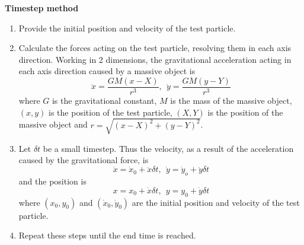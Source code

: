 \documentclass[twoside,twocolumn]{article}
\begin{document}
    \textbf{Timestep method}
    \begin{enumerate}
        \item Provide the initial position and velocity of the test particle.
        \item Calculate the forces acting on the test particle, resolving them in each axis direction. Working in 2 dimensions, the gravitational acceleration acting in each axis direction caused by a massive object is
        \begin{equation}
            \ddot{x} = \frac{GM(x - X)}{r^3}, \ \ \ddot{y} = \frac{GM(y - Y)}{r^3}
            \label{eqn:acceleration}
        \end{equation}
        where $G$ is the gravitational constant, $M$ is the mass of the massive object, $(x, y)$ is the position of the test particle, $(X, Y)$ is the position of the massive object and $r = \sqrt{(x - X)^2 + (y - Y)^2}$. 
        \item Let $\delta t$ be a small timestep. Thus the velocity, as a result of the acceleration caused by the gravitational force, is
        \begin{equation}
            \dot{x} = \dot{x}_0 + \ddot{x} \delta t, \ \ \dot{y} = \dot{y}_o + \ddot{y} \delta t
        \end{equation}
        and the position is
        \begin{equation}
            x = x_0 + \dot{x} \delta t, \ \ y = y_0 + \dot{y} \delta t
        \end{equation}
        where $(x_0, y_0)$ and $(\dot{x}_0, \dot{y}_0)$ are the initial position and velocity of the test particle.
        \item Repeat these steps until the end time is reached.
    \end{enumerate}
    \vspace{0.2cm}
\end{document}

